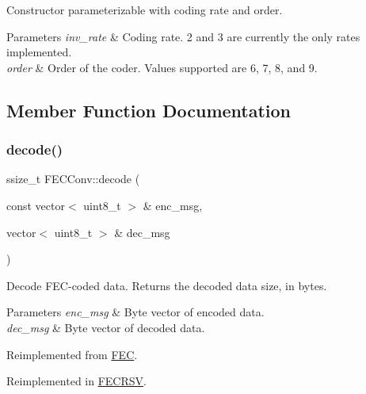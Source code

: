 Constructor parameterizable with coding rate and order. 
\begin{DoxyParams}{Parameters}
{\em inv\+\_\+rate} & Coding rate. 2 and 3 are currently the only rates implemented. \\
\hline
{\em order} & Order of the coder. Values supported are 6, 7, 8, and 9. \\
\hline
\end{DoxyParams}


\subsection{Member Function Documentation}
\mbox{\label{classFECConv_afd897d6756bbbe4874942654e91a95e3}} 
\subsubsection{\texorpdfstring{decode()}{decode()}}
{\footnotesize\ttfamily ssize\+\_\+t F\+E\+C\+Conv\+::decode (\begin{DoxyParamCaption}\item[{const vector$<$ uint8\+\_\+t $>$ \&}]{enc\+\_\+msg,  }\item[{vector$<$ uint8\+\_\+t $>$ \&}]{dec\+\_\+msg }\end{DoxyParamCaption})\hspace{0.3cm}{\ttfamily [virtual]}}

Decode F\+E\+C-\/coded data. Returns the decoded data size, in bytes. 
\begin{DoxyParams}{Parameters}
{\em enc\+\_\+msg} & Byte vector of encoded data. \\
\hline
{\em dec\+\_\+msg} & Byte vector of decoded data. \\
\hline
\end{DoxyParams}


Reimplemented from \hyperlink{classFEC_aec87f2d9c2305283d226197bf76891cf}{F\+EC}.



Reimplemented in \hyperlink{classFECRSV_a4781900bd59579d7a380687c59179ae5}{F\+E\+C\+R\+SV}.

\mbox{\label{classFECConv_ae3e796d0e026dca718ed6384653a4564}} 
